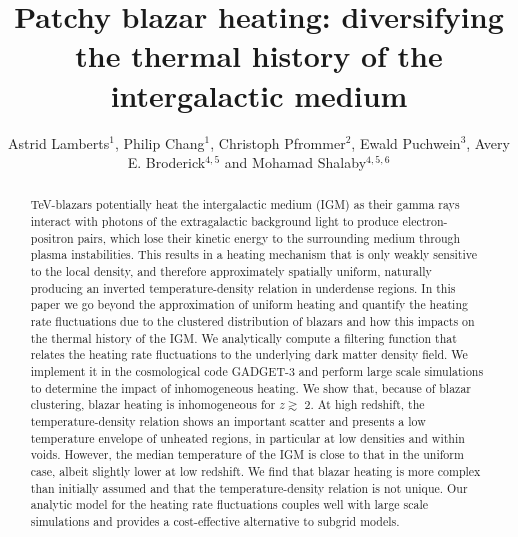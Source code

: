 \documentclass[numberedappendix]{emulateapj}
\begin{document}
\title{Patchy blazar heating: diversifying the thermal history of the intergalactic medium}
\author{Astrid Lamberts$^1$, Philip Chang$^1$,  Christoph Pfrommer$^2$, Ewald Puchwein$^3$, Avery E. Broderick$^{4,5}$ and Mohamad Shalaby$^{4,5,6}$}
\begin{abstract}
TeV-blazars potentially heat the intergalactic medium (IGM) as their gamma rays interact with photons of the extragalactic background light to produce electron-positron pairs, which lose their kinetic energy to the surrounding medium through plasma instabilities. This results in a heating mechanism that is only weakly sensitive to the local density, and therefore approximately spatially uniform, naturally  producing an inverted temperature-density relation in underdense regions. In this paper we go beyond the approximation of uniform heating and quantify the heating rate fluctuations due to the clustered distribution of blazars and how this impacts on the thermal history of the IGM. We analytically compute a filtering function that relates the heating rate fluctuations to the underlying dark matter density field. We implement it in the cosmological code GADGET-3 and perform large scale simulations to determine the impact of inhomogeneous heating. We show that, because of blazar clustering, blazar heating is inhomogeneous  for $z\gtrsim$ 2. At high redshift, the temperature-density relation shows an important scatter and presents a low temperature envelope of unheated regions, in particular at low densities and within voids. However, the median temperature of the IGM is close to that in the uniform case, albeit slightly lower at low redshift. We find that blazar heating is more complex than initially assumed and that the temperature-density relation is not unique. Our analytic model for the heating rate fluctuations couples well with large scale simulations and provides a cost-effective alternative to subgrid models.
\end{abstract}
\end{document}
